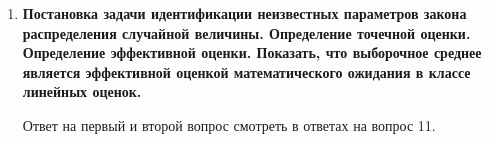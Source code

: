 \documentclass[12pt]{report}
\begin{document}
\begin{enumerate}
\begin{figure}[!h]
	\end{figure}
	
	\item \textbf{Постановка задачи идентификации неизвестных параметров закона распределения случайной величины. Определение точечной оценки. Определение эффективной оценки. Показать,
		что выборочное среднее является эффективной оценкой математического ожидания в классе
		линейных оценок.}
	
	Ответ на первый и второй вопрос смотреть в ответах на вопрос 11.
	

\end{enumerate}
\end{document}
